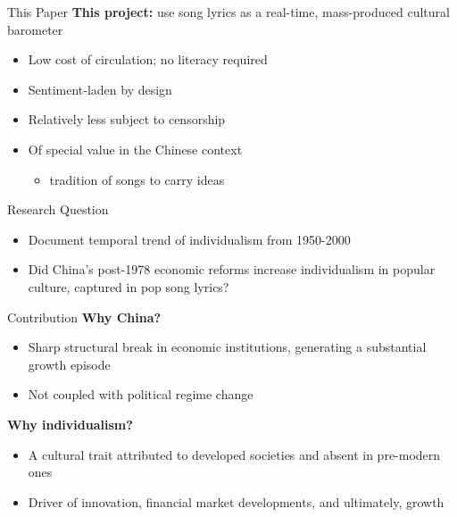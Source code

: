 \documentclass[aspectratio=169]{beamer}
\begin{document}
\begin{frame}{This Paper}
  \textbf{This project:} use \alert{song lyrics} as a real-time, mass-produced cultural barometer
  \begin{itemize}
    \item Low cost of circulation; no literacy required
    \item Sentiment-laden by design
    \item Relatively less subject to censorship
    \item Of special value in the Chinese context
    \begin{itemize}
      \item tradition of songs to carry ideas
    \end{itemize}
  \end{itemize}
  \vspace{3pt}
\begin{block}{Research Question}
  \begin{itemize}
    \item Document temporal trend of individualism from 1950-2000 
    \vspace{3pt}
    \item Did China's post-1978 economic reforms increase individualism in popular culture, captured in pop song lyrics?
  \end{itemize}
  
\end{block}
\end{frame}


\begin{frame}{Contribution}
  \textbf{Why China?}
    \begin{itemize}
      \item Sharp structural break in economic institutions, generating a substantial growth episode
      \item Not coupled with political regime change
      \end{itemize}

\vspace{0.6em}
  \textbf{Why individualism?}
    \begin{itemize}
    \item A cultural trait attributed to developed societies and absent in pre-modern ones
    \item Driver of innovation, financial market developments, and ultimately, growth
    \end{itemize}
\end{frame}
\end{document}
